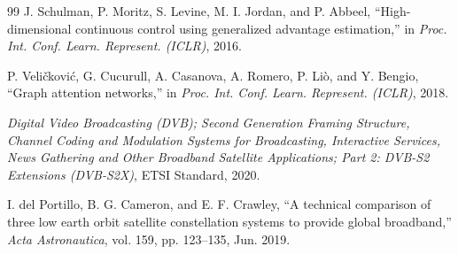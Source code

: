 \documentclass[journal]{IEEEtran}
\begin{document}
\begin{thebibliography}{99}
 J. Schulman, P. Moritz, S. Levine, M. I. Jordan, and P. Abbeel, ``High-dimensional continuous control using generalized advantage estimation,'' in \textit{Proc. Int. Conf. Learn. Represent. (ICLR)}, 2016.

 P. Veli\v{c}kovi\'c, G. Cucurull, A. Casanova, A. Romero, P. Li\`o, and Y. Bengio, ``Graph attention networks,'' in \textit{Proc. Int. Conf. Learn. Represent. (ICLR)}, 2018.

 \textit{Digital Video Broadcasting (DVB); Second Generation Framing Structure, Channel Coding and Modulation Systems for Broadcasting, Interactive Services, News Gathering and Other Broadband Satellite Applications; Part 2: DVB-S2 Extensions (DVB-S2X)}, ETSI Standard, 2020.

 I. del Portillo, B. G. Cameron, and E. F. Crawley, ``A technical comparison of three low earth orbit satellite constellation systems to provide global broadband,'' \textit{Acta Astronautica}, vol. 159, pp. 123--135, Jun. 2019.
\end{thebibliography}
\end{document}
